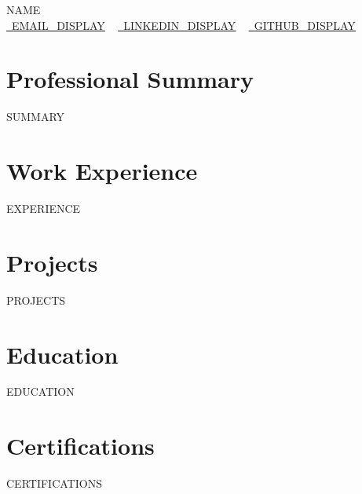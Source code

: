 \documentclass[letterpaper,11pt]{article}
\newcommand{\resumeSubHeadingListStart}{\begin{itemize}[leftmargin=0.0in, label={}]}
\newcommand{\resumeSubHeadingListEnd}{\end{itemize}}
\begin{document}
    \begin{center}
        {\Huge\scshape {{NAME}}} \\
        \small
        \href{{{EMAIL_URL}}}{\raisebox{-0.2\height}\faEnvelope\  \underline{{{EMAIL_DISPLAY}}}} ~
        \href{{{LINKEDIN_URL}}}{\raisebox{-0.2\height}\faLinkedin\ \underline{{{LINKEDIN_DISPLAY}}}}  ~
        \href{{{GITHUB_URL}}}{\raisebox{-0.2\height}\faGithub\ \underline{{{GITHUB_DISPLAY}}}}
    \end{center}

\section{Professional Summary}
{{SUMMARY}}

\section{Work Experience}
  \resumeSubHeadingListStart
{{EXPERIENCE}}
  \resumeSubHeadingListEnd

\section{Projects}
\resumeSubHeadingListStart
{{PROJECTS}}
\resumeSubHeadingListEnd

\section{Education}
  \resumeSubHeadingListStart
{{EDUCATION}}
  \resumeSubHeadingListEnd

\section{Certifications}
  \resumeSubHeadingListStart
{{CERTIFICATIONS}}
  \resumeSubHeadingListEnd

\end{document}
